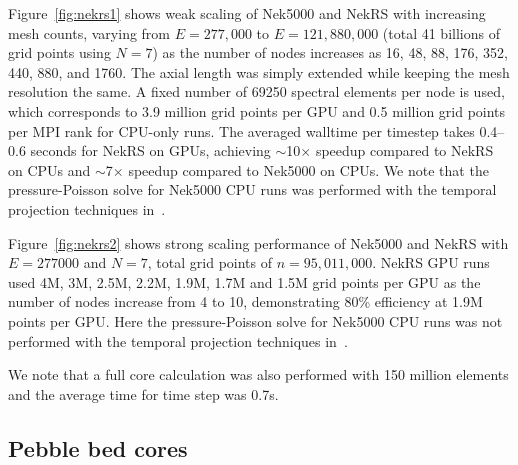 \documentclass{anstrans}
\begin{document}
\medskip
Figure~\ref{fig:nekrs1} shows weak scaling of Nek5000 and NekRS with increasing mesh counts,
varying from $E = 277,000$ to $E = 121,880,000$ (total 41 billions of grid points using $N = 7$) 
as the number of nodes increases as 16, 48, 88, 176, 352, 440, 880, and 1760. 
The axial length was simply extended while keeping the mesh resolution the same. 
A fixed number of 69250 spectral elements per node is used, which corresponds 
to 3.9 million grid points per GPU and 0.5 million grid points per MPI rank for CPU-only runs.
The averaged walltime per timestep takes 0.4--0.6 seconds for NekRS on GPUs,
achieving $\sim$10$\times$ speedup compared to NekRS on CPUs and 
$\sim$7$\times$ speedup compared to Nek5000 on CPUs. 
We note that the pressure-Poisson solve for Nek5000 CPU runs was performed with the temporal 
projection techniques in~\cite{Fischer1998}.

\medskip
Figure~\ref{fig:nekrs2} shows strong scaling performance of Nek5000 and NekRS with $E = 277000$ 
and $N = 7$, total grid points of $n = 95,011,000$. NekRS GPU runs used 
4M, 3M, 2.5M, 2.2M, 1.9M, 1.7M and 1.5M grid points per GPU as the number of nodes increase 
from 4 to 10, demonstrating 80\% efficiency at 1.9M points per GPU.
Here the pressure-Poisson solve for Nek5000 CPU runs was not performed with the temporal projection 
techniques in~\cite{Fischer1998}.

\medskip
We note that a full core calculation was also performed with 150 million elements and the average 
time for time step was 0.7s.



\subsection{Pebble bed cores}
\end{document}
